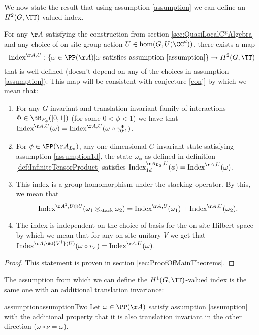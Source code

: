We now state the result that using assumption \ref{assumption} we can define an $H^2(G,\TT)$-valued index.
\begin{theorem}\label{thrm:ExistenceFirstIndex}
	For any $\AA$ satisfying the construction from section \ref{sec:QuasiLocalC*Algebra} and any choice of on-site group action $U\in\hom(G,U(\CC^d))$, there exists a map
	\begin{equation}
		\textrm{Index}^{\AA,U}:\{\omega\in\PP(\AA)|\omega\text{ satisfies assumption \ref{assumption}}\}\rightarrow H^2(G,\TT)
	\end{equation}
	that is well-defined (doesn't depend on any of the choices in assumption \ref{assumption}). This map will be consistent with conjecture \ref{conj} by which we mean that:
	\begin{enumerate}
		\item For any $G$ invariant and translation invariant family of interactions $\Phi\in\BB_{F_{\phi}}([0,1])$ (for some $0<\phi<1$) we have that $\textrm{Index}^{\AA,U}(\omega)=\textrm{Index}^{\AA,U}(\omega\circ\gamma^{\Phi}_{0;1})$.
		\item For $\phi\in\PP(\AA_{L_0})$, any one dimensional $G$-invariant state satisfying assumption \ref{assumption1d}, the state $\omega_\phi$ as defined in definition \ref{def:InfiniteTensorProduct} satisfies $\textrm{Index}^{\AA_{L_0},U}_{1d}(\phi)=\textrm{Index}^{\AA,U}(\omega)$.
		\item This index is a group homomorphism under the stacking operator. By this, we mean that
		\begin{equation}
			\textrm{Index}^{\AA^2,U\otimes U}(\omega_1\otimes_{\text{stack}}\omega_2)=\textrm{Index}^{\AA,U}(\omega_1)+\textrm{Index}^{\AA,U}(\omega_2).
		\end{equation}
		\item The index is independent on the choice of basis for the on-site Hilbert space by which we mean that for any on-site unitary $V$ we get that $\textrm{Index}^{\AA,\Ad{V^\dagger}(U)}(\omega\circ i_V)=\textrm{Index}^{\AA,U}(\omega)$.
	\end{enumerate}
\end{theorem}
\begin{proof}
	This statement is proven in section \ref{sec:ProofOfMainTheorems}.
\end{proof}
The assumption from which we can define the $H^1(G,\TT)$-valued index is the same one with an additional translation invariance:
\begin{restatable}{assumption}{assumptionTwo}\label{assumption:2Translations}
	Let $\omega\in\PP(\AA)$ satisfy assumption \ref{assumption} with the additional property that it is also translation invariant in the other direction ($\omega\circ\nu=\omega$).
\end{restatable}
